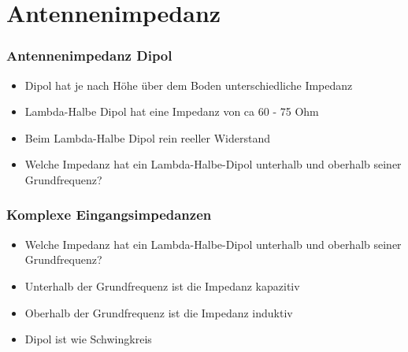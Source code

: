 \section*{Antennenimpedanz}

\begin{frame}
  \frametitle{Antennenimpedanz Dipol}
  \begin{center}
    \begin{itemize}
      \item Dipol hat je nach Höhe über dem Boden unterschiedliche Impedanz \\[1em]
      \item Lambda-Halbe Dipol hat eine Impedanz von ca 60 - 75 Ohm \\[1em]
      \item Beim Lambda-Halbe Dipol rein reeller Widerstand \\[1em]
      \item Welche Impedanz hat ein Lambda-Halbe-Dipol unterhalb und oberhalb seiner Grundfrequenz? \\[1em]
    \end{itemize}
  \end{center}
\end{frame}

\begin{frame}
  \frametitle{Komplexe Eingangsimpedanzen}
  \begin{center}
    \begin{itemize}
      \item Welche Impedanz hat ein Lambda-Halbe-Dipol unterhalb und oberhalb seiner Grundfrequenz? \\[1em]
      \item Unterhalb der Grundfrequenz ist die Impedanz kapazitiv \\[1em]
      \item Oberhalb der Grundfrequenz ist die Impedanz induktiv \\[1em]
      \item Dipol ist wie Schwingkreis
    \end{itemize}
  \end{center}
\end{frame}

